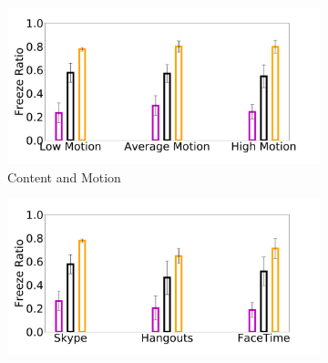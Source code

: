 \begin{figure}
    \begin{subfigure}[b]{0.33\textwidth}
        \centering
        \includegraphics[width=1\linewidth]{sections/network-work/content-stutter}
        \caption{Content and Motion}
    \end{subfigure}
    \begin{subfigure}[b]{0.33\textwidth}
        \centering
        \includegraphics[width=1\linewidth]{sections/network-work/app-stutter}

\end{subfigure}
\end{figure}
